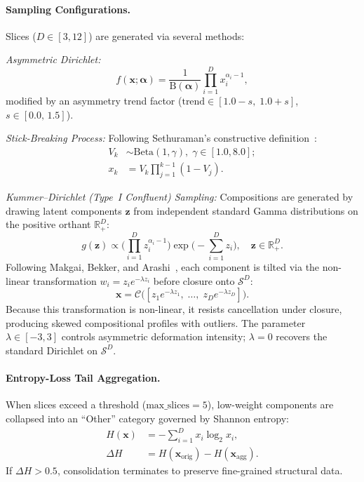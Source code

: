 \documentclass[11pt,twocolumn]{article}
\newcommand{\simplex}{\mathcal{S}}
\newcommand{\closure}{\mathcal{C}}
\newcommand{\R}{\mathbb{R}}
\begin{document}
\paragraph{Sampling Configurations.}
Slices ($D \in [3, 12]$) are generated via several methods:

\noindent\emph{Asymmetric Dirichlet:}
\begin{equation}\label{eq:dirichlet}
  f(\mathbf{x};\bm{\alpha}) = \frac{1}{\mathrm{B}(\bm{\alpha})}\prod_{i=1}^D x_i^{\alpha_i - 1},
\end{equation}
modified by an asymmetry trend factor ($\text{trend} \in [1.0-s,\;1.0+s]$, $s \in [0.0,\,1.5]$).

\noindent\emph{Stick-Breaking Process:} Following Sethuraman's constructive definition~\cite{sethuraman1994constructive}:
\begin{align}\label{eq:stickbreak}
  V_k &\sim \text{Beta}(1, \gamma),\;\gamma \in [1.0,8.0]; \nonumber\\
  x_k &= V_k\!\prod_{j=1}^{k-1}(1 - V_j).
\end{align}

\noindent\emph{Kummer--Dirichlet (Type~I Confluent) Sampling:}
Compositions are generated by drawing latent components $\mathbf{z}$ from independent standard Gamma distributions on the positive orthant $\R_+^D$:
\begin{equation}\label{eq:kdga_raw}
  g(\mathbf{z}) \propto \biggl(\prod_{i=1}^D z_i^{\alpha_i - 1}\biggr)\exp\biggl(-\sum_{i=1}^D z_i\biggr),\quad \mathbf{z} \in \R_+^D.
\end{equation}
Following Makgai, Bekker, and Arashi~\cite{makgai2021compositional}, each component is tilted via the non-linear transformation $w_i = z_i e^{-\lambda z_i}$ before closure onto $\simplex^D$:
\begin{equation}\label{eq:kdga_closure}
  \mathbf{x} = \closure\!\bigl([z_1 e^{-\lambda z_1},\;\dots,\;z_D e^{-\lambda z_D}]\bigr).
\end{equation}
Because this transformation is non-linear, it resists cancellation under closure, producing skewed compositional profiles with outliers. The parameter $\lambda \in [-3, 3]$ controls asymmetric deformation intensity; $\lambda = 0$ recovers the standard Dirichlet on $\simplex^D$.

\paragraph{Entropy-Loss Tail Aggregation.}
When slices exceed a threshold ($\text{max\_slices}=5$), low-weight components are collapsed into an ``Other'' category governed by Shannon entropy:
\begin{align}
  H(\mathbf{x}) &= -\sum_{i=1}^D x_i \log_2 x_i, \label{eq:entropy}\\
  \Delta H &= H(\mathbf{x}_{\text{orig}}) - H(\mathbf{x}_{\text{agg}}). \label{eq:entropy_loss}
\end{align}
If $\Delta H > 0.5$, consolidation terminates to preserve fine-grained structural data.
\end{document}
